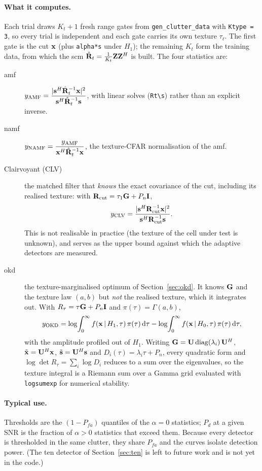 \documentclass{article}
\begin{document}
\paragraph{What it computes.} Each trial draws $K_t+1$ fresh range gates from \texttt{gen\_clutter\_data} with \texttt{Ktype = 3}, so every trial is independent and each gate carries its own texture $\tau_\ell$. The first gate is the \gls{cut} $\vb x$ (plus \texttt{alpha*s} under $H_1$); the remaining $K_t$ form the training data, from which the \gls{scm} $\hat{\mathbf{R}}_t=\frac1{K_t}\mathbf{Z}\mathbf{Z}^{H}$ is built. The four statistics are:
\begin{description}
  \item[\gls{amf}] $\displaystyle y_\text{AMF}=\frac{|\vb s^H\hat{\mathbf{R}}_t^{-1}\vb x|^2}{\vb s^H\hat{\mathbf{R}}_t^{-1}\vb s}$, with linear solves (\texttt{Rt\textbackslash s}) rather than an explicit inverse.
  \item[\gls{namf}] $\displaystyle y_\text{NAMF}=\frac{y_\text{AMF}}{\vb x^H\hat{\mathbf{R}}_t^{-1}\vb x}$, the texture-CFAR normalisation of the \gls{amf}.
  \item[Clairvoyant (CLV)] the matched filter that \emph{knows} the exact covariance of the \gls{cut}, including its realised texture: with $\mathbf{R}_\text{cut}=\tau_1\mathbf{G}+P_n\mathbf{I}$,
    \[
      y_\text{CLV}=\frac{|\vb s^H\mathbf{R}_\text{cut}^{-1}\vb x|^2}{\vb s^H\mathbf{R}_\text{cut}^{-1}\vb s}.
    \]
    This is not realisable in practice (the texture of the cell under test is unknown), and serves as the upper bound against which the adaptive detectors are measured.
  \item[\gls{okd}] the texture-marginalised optimum of Section~\ref{sec:okd}. It knows $\mathbf{G}$ and the texture law $(a,b)$ but \emph{not} the realised texture, which it integrates out. With $R_\tau=\tau\mathbf{G}+P_n\mathbf{I}$ and $\pi(\tau)=\Gamma(a,b)$,
    \[
      y_\text{OKD}=\log\!\int_0^\infty f(\vb x\,|\, H_1,\tau)\,\pi(\tau)\,\mathrm{d}\tau
                  -\log\!\int_0^\infty f(\vb x\,|\, H_0,\tau)\,\pi(\tau)\,\mathrm{d}\tau,
    \]
    with the amplitude profiled out of $H_1$. Writing $\mathbf{G}=\mathbf{U}\,\mathrm{diag}(\lambda_i)\,\mathbf{U}^{H}$, $\tilde{\vb x}=\mathbf{U}^H\vb x$, $\tilde{\vb s}=\mathbf{U}^H\vb s$ and $D_i(\tau)=\lambda_i\tau+P_n$, every quadratic form and $\log\det R_\tau=\sum_i\log D_i$ reduces to a sum over the eigenvalues, so the texture integral is a Riemann sum over a Gamma grid evaluated with \texttt{logsumexp} for numerical stability.
\end{description}

\paragraph{Typical use.} Thresholds are the $(1-P_{fa})$ quantiles of the $\alpha=0$ statistics; $P_d$ at a given SNR is the fraction of $\alpha>0$ statistics that exceed them. Because every detector is thresholded in the same clutter, they share $P_{fa}$ and the curves isolate detection power. (The \gls{ten} detector of Section~\ref{sec:ten} is left to future work and is not yet in the code.)
\end{document}
